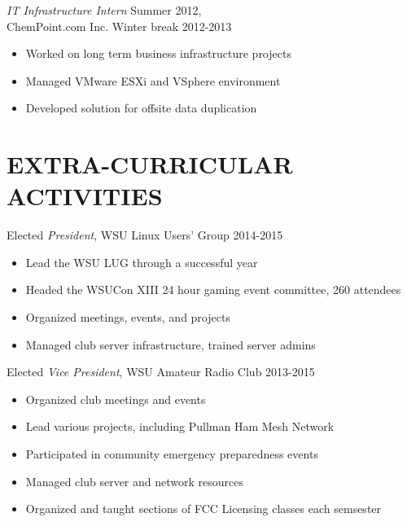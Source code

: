 \documentclass[line, margin]{res}
\begin{document}
\begin{resume}
                {\sl IT Infrastructure Intern} \hfill           Summer 2012,\\
                ChemPoint.com Inc. \hfill Winter break 2012-2013
                 \begin{itemize}  \itemsep -2pt %
                 \item  Worked on long term business infrastructure projects
                 \item  Managed VMware ESXi and VSphere environment
                 \item  Developed solution for offsite data duplication
                 \end{itemize} 
 

\section{EXTRA-CURRICULAR \\ ACTIVITIES}             
            Elected {\it President}, WSU Linux Users' Group \hfill 2014-2015
        \begin{itemize} \itemsep -2pt
                \item Lead the WSU LUG through a successful year
                \item Headed the WSUCon XIII 24 hour gaming event committee, 260 attendees
                \item Organized meetings, events, and projects
                \item Managed club server infrastructure, trained server admins
            \end{itemize}
            Elected {\it Vice President}, WSU Amateur Radio Club \hfill 2013-2015
        \begin{itemize} \itemsep -2pt
                \item Organized club meetings and events
                \item Lead various projects, including Pullman Ham Mesh Network
                \item Participated in community emergency preparedness events
                \item Managed club server and network resources
                \item Organized and taught sections of FCC Licensing classes each semsester
            \end{itemize}


\end{resume}
\end{document}
